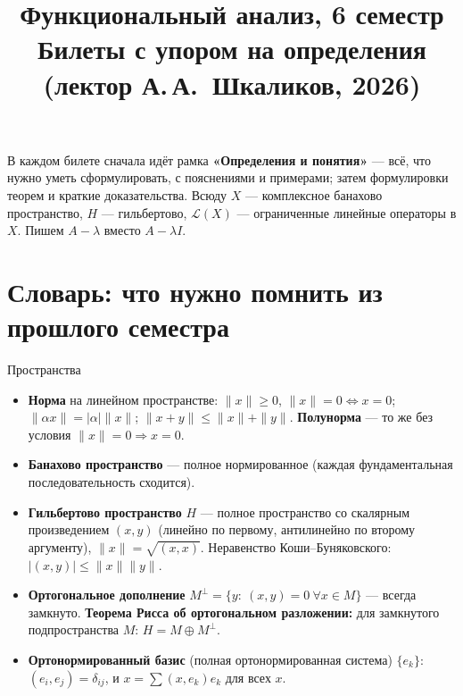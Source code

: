 \documentclass[11pt,a4paper]{article}
\title{\textbf{Функциональный анализ, 6 семестр}\\[2pt]\large Билеты с упором на определения (лектор А.\,А.~Шкаликов, 2026)}
\date{}
\newcommand{\Lc}{\mathcal L}
\begin{document}
\maketitle
\vspace{-8mm}
\begin{center}\small
В каждом билете сначала идёт рамка \textbf{«Определения и понятия»} — всё, что нужно уметь сформулировать, с пояснениями и примерами; затем формулировки теорем и краткие доказательства. Всюду $X$ — комплексное банахово пространство, $H$ — гильбертово, $\Lc(X)$ — ограниченные линейные операторы в $X$. Пишем $A-\lambda$ вместо $A-\lambda I$.
\end{center}
\tableofcontents
\newpage

\section*{Словарь: что нужно помнить из прошлого семестра}

\begin{base}{Пространства}
\begin{itemize}
\item \textbf{Норма} на линейном пространстве: $\|x\|\ge0$, $\|x\|=0\iff x=0$; $\|\alpha x\|=|\alpha|\|x\|$; $\|x+y\|\le\|x\|+\|y\|$. \textbf{Полунорма} — то же без условия $\|x\|=0\Rightarrow x=0$.
\item \textbf{Банахово пространство} — полное нормированное (каждая фундаментальная последовательность сходится).
\item \textbf{Гильбертово пространство} $H$ — полное пространство со скалярным произведением $(x,y)$ (линейно по первому, антилинейно по второму аргументу), $\|x\|=\sqrt{(x,x)}$. Неравенство Коши–Буняковского: $|(x,y)|\le\|x\|\|y\|$.
\item \textbf{Ортогональное дополнение} $M^\perp=\{y:\ (x,y)=0\ \forall x\in M\}$ — всегда замкнуто. \textbf{Теорема Рисса об ортогональном разложении:} для замкнутого подпространства $M$: $H=M\oplus M^\perp$.
\item \textbf{Ортонормированный базис} (полная ортонормированная система) $\{e_k\}$: $(e_i,e_j)=\delta_{ij}$, и $x=\sum(x,e_k)e_k$ для всех $x$.
\end{itemize}
\end{base}
\end{document}
